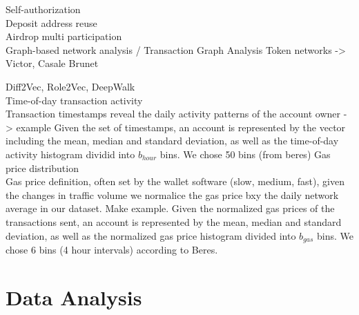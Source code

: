 \documentclass[12pt,a4paper,titlepage,oneside,english]{article}
\begin{document}
Self-authorization \\
Deposit address reuse \\
Airdrop multi participation \\

Graph-based network analysis / Transaction Graph Analysis
Token networks -> Victor, Casale Brunet


Diff2Vec, Role2Vec, DeepWalk \\
Time-of-day transaction activity \\
Transaction timestamps reveal the daily activity patterns of the account owner -> example
Given the set of timestamps, an account is represented by the vector including the mean, median and standard deviation, as well as the time-of-day activity histogram dividid into $b_{hour}$ bins. We chose 50 bins (from beres)
Gas price distribution \\
Gas price definition, often set by the wallet software (slow, medium, fast), given the changes in traffic volume we normalice the gas price bxy the daily network average in our dataset. Make example. Given the normalized gas prices of the transactions sent, an account is represented by the mean, median and standard deviation, as well as the normalized gas price histogram divided into $b_{gas}$ bins. We chose 6 bins (4 hour intervals) according to Beres.




\section{Data Analysis}
\end{document}
